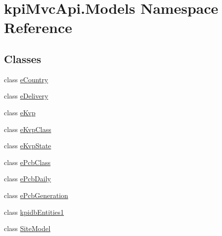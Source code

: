 \hypertarget{namespacekpi_mvc_api_1_1_models}{}\section{kpi\+Mvc\+Api.\+Models Namespace Reference}
\label{namespacekpi_mvc_api_1_1_models}
\subsection*{Classes}
\begin{DoxyCompactItemize}
\item 
class \hyperlink{classkpi_mvc_api_1_1_models_1_1e_country}{e\+Country}
\item 
class \hyperlink{classkpi_mvc_api_1_1_models_1_1e_delivery}{e\+Delivery}
\item 
class \hyperlink{classkpi_mvc_api_1_1_models_1_1e_kvp}{e\+Kvp}
\item 
class \hyperlink{classkpi_mvc_api_1_1_models_1_1e_kvp_class}{e\+Kvp\+Class}
\item 
class \hyperlink{classkpi_mvc_api_1_1_models_1_1e_kvp_state}{e\+Kvp\+State}
\item 
class \hyperlink{classkpi_mvc_api_1_1_models_1_1e_pcb_class}{e\+Pcb\+Class}
\item 
class \hyperlink{classkpi_mvc_api_1_1_models_1_1e_pcb_daily}{e\+Pcb\+Daily}
\item 
class \hyperlink{classkpi_mvc_api_1_1_models_1_1e_pcb_generation}{e\+Pcb\+Generation}
\item 
class \hyperlink{classkpi_mvc_api_1_1_models_1_1kpidb_entities1}{kpidb\+Entities1}
\item 
class \hyperlink{classkpi_mvc_api_1_1_models_1_1_site_model}{Site\+Model}
\end{DoxyCompactItemize}
